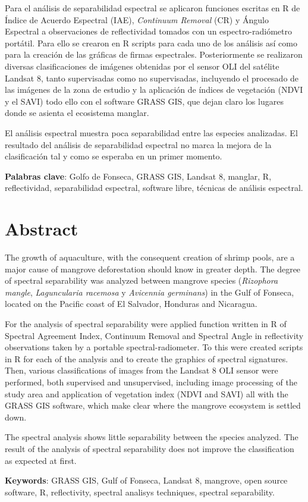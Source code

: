 Para el análisis de separabilidad espectral se aplicaron funciones escritas en R de Índice de Acuerdo Espectral (IAE), \textit{Continuum Removal} (CR) y Ángulo Espectral a observaciones de reflectividad tomados con un espectro-radiómetro portátil. Para ello se crearon en R scripts para cada uno de los análisis así como para la creación de las gráficas de firmas espectrales. Posteriormente se realizaron diversas clasificaciones de imágenes obtenidas por el sensor OLI del satélite Landsat 8, tanto supervisadas como no supervisadas, incluyendo el procesado de las imágenes de la zona de estudio y la aplicación de índices de vegetación (NDVI y el SAVI) todo ello con el software GRASS GIS, que dejan claro los lugares donde se asienta el ecosistema manglar.

El análisis espectral muestra poca separabilidad entre las especies analizadas. El resultado del análisis de separabilidad espectral no marca la mejora de la clasificación tal y como se esperaba en un primer momento.

\noindent\textbf{Palabras clave}: Golfo de Fonseca, GRASS GIS, Landsat 8, manglar, R, reflectividad, separabilidad espectral, software libre, técnicas de análisis espectral.

\section*{Abstract}
The growth of aquaculture, with the consequent creation of shrimp pools, are a major cause of mangrove deforestation should know in greater depth. The degree of spectral separability was analyzed between mangrove species (\textit{Rizophora mangle}, \textit{Laguncularia racemosa} y \textit{Avicennia germinans}) in the Gulf of Fonseca, located on the Pacific coast of El Salvador, Honduras and Nicaragua.

For the analysis of spectral separability were applied function written in R of Spectral Agreement Index, Continuum Removal and Spectral Angle in reflectivity observations taken by a portable spectral-radiometer. To this were created scripts in R for each of the analysis and to create the graphics of spectral signatures. Then, various classifications of images from the Landsat 8 OLI sensor were performed, both supervised and unsupervised, including image processing of the study area and application of vegetation index (NDVI and SAVI) all with the GRASS GIS software, which make clear where the mangrove ecosystem is settled down.

The spectral analysis shows little separability between the species analyzed. The result of the analysis of spectral separability does not improve the classification as expected at first.

\noindent\textbf{Keywords}: GRASS GIS, Gulf of Fonseca, Landsat 8, mangrove, open source software, R, reflectivity, spectral analisys techniques, spectral separability.